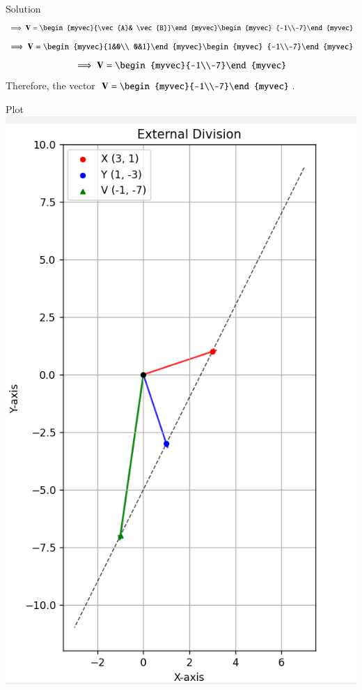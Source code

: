 \documentclass{beamer}
\begin{document}
\begin{frame}{Solution}
 \begin{align}
\implies \vec{V}=\begin{myvec}{\vec{A}& \vec{B}}\end{myvec}\begin{myvec}
        {-1\\-7}\end{myvec}
\end{align}  
\begin{align}
\implies \vec{V}=\begin{myvec}{1&0\\ 0&1}\end{myvec}\begin{myvec}
        {-1\\-7}\end{myvec}
\end{align}
\begin{align}
\implies \vec{V}=\begin{myvec}{-1\\-7}\end{myvec}
\end{align} 
Therefore, the vector $\vec{V}=\begin{myvec}{-1\\-7}\end{myvec}$.
\end{frame}

\begin{frame}{Plot}
    \centering
    \includegraphics[width=\columnwidth, height=0.8\textheight, keepaspectratio]{figs/fig.png}     
\end{frame}
\end{document}
